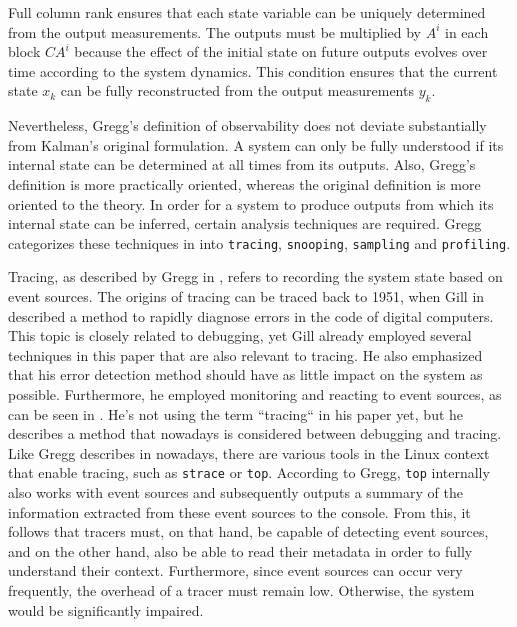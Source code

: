 Full column rank ensures that each state variable can be uniquely determined from the output measurements.
The outputs must be multiplied by $A^i$ in each block $C A^i$ because the effect of the initial state on future outputs evolves over time according to the system dynamics.
This condition ensures that the current state $x_k$ can be fully reconstructed from the output measurements $y_k$.  

Nevertheless, Gregg's definition of observability does not deviate substantially from Kalman's original formulation.  
A system can only be fully understood if its internal state can be determined at all times from its outputs. 
Also, Gregg's definition is more practically oriented, whereas the original definition is more oriented to the theory.
In order for a system to produce outputs from which its internal state can be inferred, certain analysis techniques are required.  
Gregg categorizes these techniques in \cite[Chap.~1.2]{Gregg_2020} into \texttt{tracing}, \texttt{snooping}, \texttt{sampling} and \texttt{profiling}.  

Tracing, as described by Gregg in \cite[Chap.~1.2]{Gregg_2020}, refers to recording the system state based on event sources.  
The origins of tracing can be traced back to 1951, when Gill in \cite{doi:10.1098/rspa.1951.0087} described a method to rapidly diagnose errors in the code of digital computers.  
This topic is closely related to debugging, yet Gill already employed several techniques in this paper that are also relevant to tracing.  
He also emphasized that his error detection method should have as little impact on the system as possible.  
Furthermore, he employed monitoring and reacting to event sources, as can be seen in \cite[p.~540, 547]{doi:10.1098/rspa.1951.0087}.  
He's not using the term ``tracing`` in his paper yet, but he describes a method that nowadays is considered between debugging and tracing.
Like Gregg describes in \cite[Chap. 1.2]{Gregg_2020} nowadays, there are various tools in the Linux context that enable tracing, such as \texttt{strace} \cite{strace} or \texttt{top}.  
According to Gregg, \texttt{top} internally also works with event sources and subsequently outputs a summary of the information extracted from these event sources to the console.  
From this, it follows that tracers must, on that hand, be capable of detecting event sources, and on the other hand, also be able to read their metadata in order to fully understand their context.  
Furthermore, since event sources can occur very frequently, the overhead of a tracer must remain low.
Otherwise, the system would be significantly impaired.  

